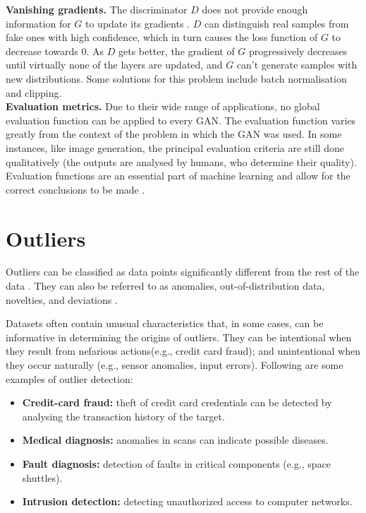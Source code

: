\noindent\textbf{Vanishing gradients.} The discriminator $D$ does not provide enough information for $G$ to update its gradients \cite{little.etal_GenerativeAdversarialNetworks_2021}. $D$ can distinguish real samples from fake ones with high confidence, which in turn causes the loss function of $G$ to decrease towards 0. As $D$ gets better, the gradient of $G$ progressively decreases until virtually none of the layers are updated, and $G$ can't generate samples with new distributions. Some solutions for this problem include batch normalisation and clipping.\\

\noindent\textbf{Evaluation metrics.} Due to their wide range of applications, no global evaluation function can be applied to every GAN. The evaluation function varies greatly from the context of the problem in which the GAN was used. In some instances, like image generation, the principal evaluation criteria are still done qualitatively (the outputs are analysed by humans, who determine their quality). Evaluation functions are an essential part of machine learning and allow for the correct conclusions to be made \cite{saxena.cao_GenerativeAdversarialNetworks_2022}.


\section{Outliers}
Outliers can be classified as data points significantly different from the rest of the data \cite{aggarwal_OutlierAnalysis_2013}. They can also be referred to as anomalies, out-of-distribution data, novelties, and deviations \cite{aggarwal_OutlierAnalysis_2013, xia.etal_GANbasedAnomalyDetection_2022}.

Datasets often contain unusual characteristics that, in some cases, can be informative in determining the origins of outliers. They can be intentional when they result from nefarious actions(e.g., credit card fraud); and unintentional when they occur naturally (e.g., sensor anomalies, input errors). Following are some examples of outlier detection: 

\begin{itemize}
    \item \textbf{Credit-card fraud:} theft of credit card credentials can be detected by analysing the transaction history of the target.
    \item \textbf{Medical diagnosis:} anomalies in scans can indicate possible diseases.
    \item \textbf{Fault diagnosis:} detection of faults in critical components (e.g., space shuttles).
    \item  \textbf{Intrusion detection:} detecting unauthorized access to computer networks.
\end{itemize}

